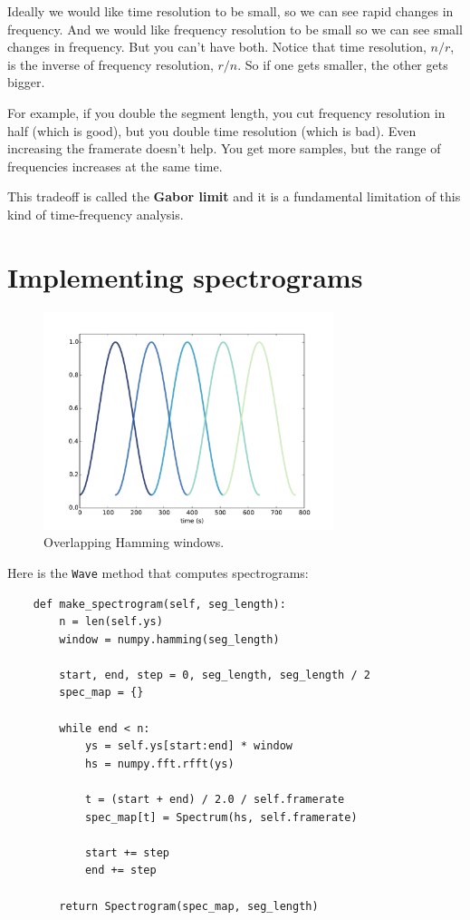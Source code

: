 \documentclass[12pt]{book}
\begin{document}
Ideally we would like time resolution to be small, so we can see rapid
changes in frequency.  And we would like frequency resolution to be
small so we can see small changes in frequency.  But you can't have
both.  Notice that time resolution, $n/r$, is the inverse of frequency
resolution, $r/n$.  So if one gets smaller, the other gets bigger.

For example, if you double the segment length, you cut frequency
resolution in half (which is good), but you double time resolution
(which is bad).  Even increasing the framerate doesn't help.  You get
more samples, but the range of frequencies increases at
the same time.

This tradeoff is called the {\bf Gabor limit} and it is a fundamental
limitation of this kind of time-frequency analysis.


\section{Implementing spectrograms}

\begin{figure}
\centerline{\includegraphics[height=2.5in]{figs/windowing3.pdf}}
\caption{Overlapping Hamming windows.}
\label{fig.windowing3}
\end{figure}

Here is the {\tt Wave} method that computes spectrograms:

\begin{verbatim}
    def make_spectrogram(self, seg_length):
        n = len(self.ys)
        window = numpy.hamming(seg_length)

        start, end, step = 0, seg_length, seg_length / 2
        spec_map = {}

        while end < n:
            ys = self.ys[start:end] * window
            hs = numpy.fft.rfft(ys)

            t = (start + end) / 2.0 / self.framerate
            spec_map[t] = Spectrum(hs, self.framerate)

            start += step
            end += step

        return Spectrogram(spec_map, seg_length)
\end{verbatim}
\end{document}
